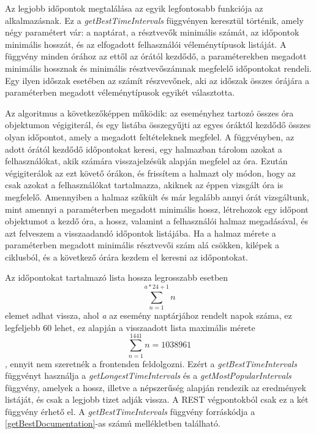 \documentclass[a4paper,12pt]{report}
\theoremstyle{definition}
\theoremstyle{remark}
\begin{document}
Az legjobb időpontok megtalálása az egyik legfontosabb funkciója az alkalmazásnak. Ez a \textit{getBestTimeIntervals} függvényen keresztül történik, amely négy paramétert vár: a naptárat, a résztvevők minimális számát, az időpontok minimális hosszát, és az elfogadott felhasználói véleménytípusok listáját. A függvény minden órához az ettől az órától kezdődő, a paraméterekben megadott minimális hossznak és minimális résztvevőszámnak megfelelő időpontokat rendeli. Egy ilyen időszak esetében az számít részvevőnek, aki az időszak összes órájára a paraméterben megadott véleménytípusok egyikét választotta.

Az algoritmus a következőképpen működik: az eseményhez tartozó összes óra objektumon végigiterál, és egy listába összegyűjti az egyes óráktól kezdődő összes olyan időpontot, amely a megadott feltételeknek megfelel. A függvényben, az adott órától kezdődő időpontokat keresi, egy halmazban tárolom azokat a felhasználókat, akik számára visszajelzésük alapján megfelel az óra. Ezután végigiterálok az ezt követő órákon, és frissítem a halmazt oly módon, hogy az csak azokat a felhasználókat tartalmazza, akiknek az éppen vizsgált óra is megfelelő. Amennyiben a halmaz szűkült és már legalább annyi órát vizsgáltunk, mint amennyi a paraméterben megadott minimális hossz, létrehozok egy időpont objektumot a kezdő óra, a hossz, valamint a felhasználói halmaz megadásával, és azt felveszem a visszaadandó időpontok listájába. Ha a halmaz mérete a paraméterben megadott minimális résztvevői szám alá csökken, kilépek a ciklusból, és a következő órára kezdem el keresni az időpontokat.

Az időpontokat tartalmazó lista hossza legrosszabb esetben
\begin{equation} \label{eq:eq1}
\sum_{n=1}^{a*24+1} {n}
\end{equation}
elemet adhat vissza, ahol \textit{a} az esemény naptárjához rendelt napok száma, ez legfeljebb 60 lehet, ez alapján a visszaadott lista maximális mérete
\begin{equation} \label{eq:eq2}
 \sum_{n=1}^{1441} {n} = 1 038 961
\end{equation}
, ennyit nem szeretnék a frontenden feldolgozni. Ezért a \textit{getBestTimeIntervals} függvényt használja a \textit{getLongestTimeIntervals} és a \textit{getMostPopularIntervals} függvény, amelyek a hossz, illetve a népszerűség alapján rendezik az eredmények listáját, és csak a legjobb tizet adják vissza. A REST végpontokból csak ez a két függvény érhető el. A \mbox{\textit{getBestTimeIntervals}} függvény forráskódja a \ref{getBestDocumentation}-as számú mellékletben található.
\end{document}

